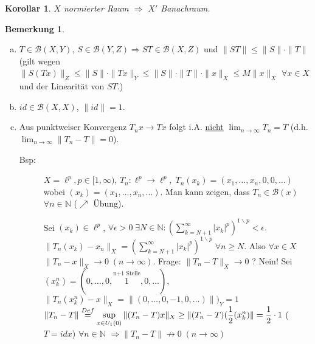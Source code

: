 \documentclass[ngerman]{report}
\theoremstyle{plain}%
\newtheorem{cor}[thm]{Korollar}
\theoremstyle{definition}%
\theoremstyle{myStyle}
\newtheorem{bem}[thm]{Bemerkung}
\newcommand{\N}{\mathbb{N}}
\newcommand{\B}{\mathcal{B}} %
\newcommand{\BS}[1][X,Y]{\mathcal{B}(#1)} %
\newcommand{\norm}[1]{\|#1\|}
\newcommand{\df}[1][]{%
	\overset{#1}{\Rightarrow}
}
\newcommand{\U}[2][1]{U_{#1}(#2)} %
\newcommand{\EK}{\U{0}} %
\newcommand{\limes}[1][\infty]{\lim_{n \to #1}}
\newcommand{\supT}[1][a]{
	\IfEqCase{#1}{
	{A}{\sup_{x \in \overline{\EK}}} 
	{R}{\sup_{x \in \partial\EK}}
	{a}{\sup_{x \in \EK}}
	}
} %
\newcommand{\disp}{\displaystyle}
\begin{document}
	\begin{cor}
		$X$ normierter Raum $\df$ $X'$ Banachraum.
	\end{cor}

	\begin{bem}
		\begin{enumerate}[a)]
			\item $T\in \BS$, $S \in \B(Y,Z) \df ST \in \B(X,Z)$ und 
				$\norm{ST} \leq \norm{S} \cdot \norm{T}$ 
				(gilt wegen $\norm{S(Tx)}_Z \leq \norm{S} \cdot \norm{Tx}_Y
				\leq \norm{S} \cdot \norm{T} \cdot \norm{x}_X \leq M \norm{x}_X$ $\forall x\in X$ und der Linearität von $ST$.) 
			\item $id\in \B(X,X)$, $\norm{id} = 1$.
			\item Aus punktweiser Konvergenz $T_nx \to Tx$ folgt
			i.A. \underline{nicht} $\disp \limes T_n = T$ (d.h. $\limes \norm{T_n - T} = 0$).
				\begin{description} \item[Bsp:] 
					$X = \ell^p, p\in [1,\infty)$, $T_n:\ell^p \to \ell^p, \; T_n(x_k) = (x_1,\dots,x_n,0,0,\dots)$ 
					wobei $(x_k) = (x_1,\dots,x_n,\dots).$ Man kann zeigen, dass $T_n \in \B(x)$ $\forall n\in\N$ 
					($\nearrow$ Übung).\par
					Sei $(x_k)\in \ell^p$, $\forall \epsilon > 0 \; \exists N\in\N: (\sum_{k=N+1}^\infty |x_k|^p)^{1\backslash p} < \epsilon.$\ $\norm{T_n(x_k) - x_n}_X = (\sum_{k=N+1}^\infty |x_k|^p)^{1\backslash p} \; \forall n\geq N$.
					Also $\forall x \in X$ $\norm{T_n - x}_X \to 0 \; (n\to \infty).$ Frage: $\norm{T_n - T}_X \to 0$ ?
					Nein! Sei $(x_k^n) = (0,\dots,0,\overset{\text{n+1 Stelle}}{1},0,\dots)$,  
					$\norm{T_n(x_k^n) - x}_X = \norm{(0,\dots,0,-1,0,\dots)})_Y = 1$ 
					$\disp \norm{T_n - T} \overset{Def}{=} \supT \norm{(T_n - T)x}_X \geq 
					\norm{(T_n - T)(\frac{1}{2} (x_k^n)} =\frac{1}{2}\cdot 1$ ($T = idx$) $\forall n\in\N$ 
					$\df \norm{T_n - T} \not\to 0\; (n\to\infty)$
				\end{description}


\end{enumerate}
\end{bem}
\end{document}
